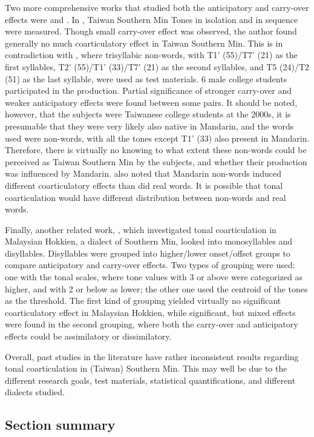 Two more comprehensive works that studied both the anticipatory and carry-over effects were \cite{Lin1988} and \cite{Wang2002}. In \cite{Lin1988}, Taiwan Southern Min Tones in isolation and in sequence were measured. Though small carry-over effect was observed, the author found generally no much coarticulatory effect in Taiwan Southern Min. This is in contradiction with \cite{Wang2002}, where trisyllabic non-words, with T1' (55)/T7' (21) as the first syllables, T2' (55)/T1' (33)/T7' (21) as the second syllables, and T5 (24)/T2 (51) as the last syllable, were used as test materials. 6 male college students participated in the production. Partial significance of stronger carry-over and weaker anticipatory effects were found between some pairs. It should be noted, however, that the subjects were Taiwanese college students at the 2000s, it is presumable that they were very likely also native in Mandarin, and the words used were non-words, with all the tones except T1' (33) also present in Mandarin. Therefore, there is virtually no knowing to what extent these non-words could be perceived as Taiwan Southern Min by the subjects, and whether their production was influenced by Mandarin. \cite{ShihSproat1992} also noted that Mandarin non-words induced different coarticulatory effects than did real words. It is possible that tonal coarticulation would have different distribution between non-words and real words.

Finally, another related work, \cite{ChangHsieh2012}, which investigated tonal coarticulation in Malaysian Hokkien, a dialect of Southern Min, looked into monosyllables and disyllables. Disyllables were grouped into higher/lower onset/offset groups to compare anticipatory and carry-over effects. Two types of grouping were used: one with the tonal scales, where tone values with 3 or above were categorized as higher, and with 2 or below as lower; the other one used the centroid of the tones as the threshold. The first kind of grouping yielded virtually no significant coarticulatory effect in Malaysian Hokkien, while significant, but mixed effects were found in the second grouping, where both the carry-over and anticipatory effects could be assimilatory or dissimilatory.

Overall, past studies in the literature have rather inconsistent results regarding tonal coarticulation in (Taiwan) Southern Min. This may well be due to the different research goals, test materials, statistical quantifications, and different dialects studied.

\subsection{Section summary}

